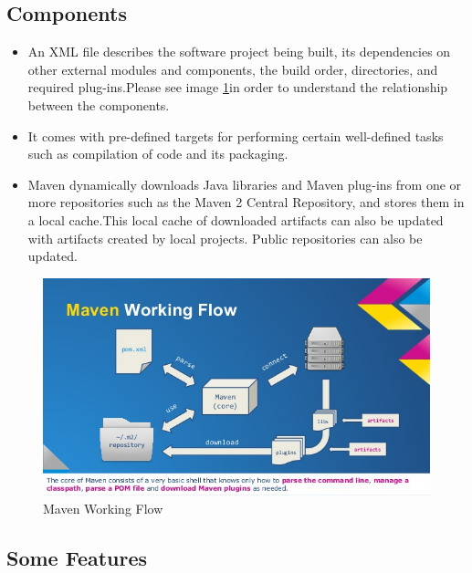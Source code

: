 \subsection{Components}

\begin{itemize}

\item An XML file describes the software project being built, its dependencies on other external modules and components, the build order, directories, and required plug-ins.Please see image \ref{fig:maven}in order to understand the relationship between the components. 

\item It comes with pre-defined targets for performing certain well-defined tasks such as compilation of code and its packaging. 

\item Maven dynamically downloads Java libraries and Maven plug-ins from one or more repositories such as the Maven 2 Central Repository, and stores them in a local cache.This local cache of downloaded artifacts can also be updated with artifacts created by local projects. Public repositories can also be updated.

\end{itemize}



\begin{figure}[h]
    \center{}
    \includegraphics[width=1\textwidth]{maven}
    \caption{Maven Working Flow
    \protect\footnotemark}\label{fig:maven}
\end{figure}

\subsection{Some Features}

